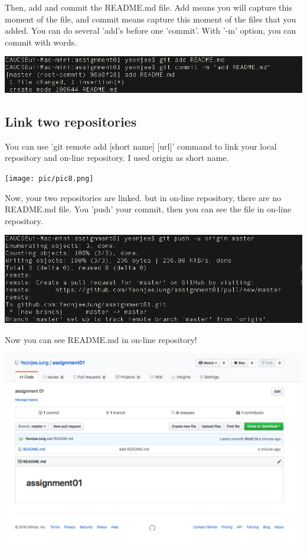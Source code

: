 \documentclass{article}
\begin{document}
Then, add and commit the README.md file. Add means you will capture this moment of the file, and commit means capture this moment of the files that you added. You can do several 'add's before one 'commit'. With '-m' option, you can commit with words.
\begin{center}
    \includegraphics[scale = 0.5]{pic/pic7.png}
\end{center}

\subsection{Link two repositories}
You can use 'git remote add [short name] [url]' command to link your local repository and on-line repository. I used origin as short name.
\begin{center}
    \texttt{[image: pic/pic8.png]}
\end{center}

\newpage
Now, your two repositories are linked. but in on-line repository, there are no README.md file. You 'push' your commit, then you can see the file in on-line repository.
\begin{center}
    \includegraphics[scale = 0.5]{pic/pic9.png}
\end{center}

Now you can see README.md in on-line repository!
\begin{center}
    \includegraphics[scale = 0.4]{pic/pic10.png}
\end{center}
\end{document}
